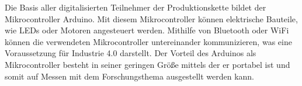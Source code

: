 Die Basis aller digitalisierten Teilnehmer der Produktionskette bildet der Mikrocontroller Arduino. Mit diesem Mikrocontroller können elektrische Bauteile, wie LEDs oder Motoren angesteuert werden. Mithilfe von Bluetooth oder WiFi können die verwendeten Mikrocontroller untereinander kommunizieren, was eine Voraussetzung für Industrie 4.0 darstellt. Der Vorteil des Arduinos als Mikrocontroller besteht in seiner geringen Größe mittels der er portabel ist und somit auf Messen mit dem Forschungsthema ausgestellt werden kann.  